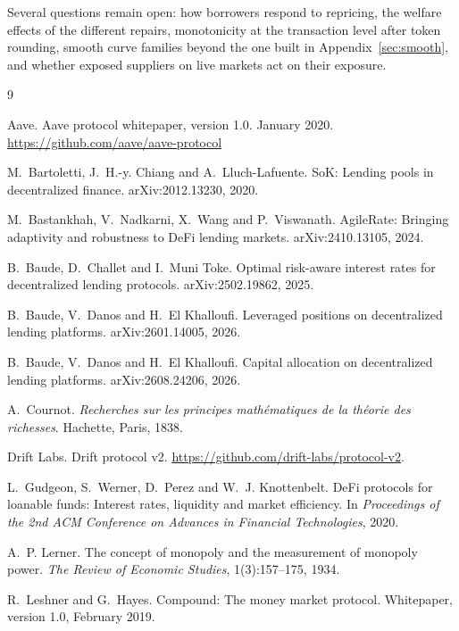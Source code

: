 \documentclass[11pt,a4paper]{article}
\begin{document}
Several questions remain open: how borrowers respond to repricing, the welfare effects of the different repairs, monotonicity at the transaction level after token rounding, smooth curve families beyond the one built in Appendix~\ref{sec:smooth}, and whether exposed suppliers on live markets act on their exposure.

\begin{thebibliography}{9}

Aave.
\newblock Aave protocol whitepaper, version 1.0.
\newblock January 2020.
\newblock \url{https://github.com/aave/aave-protocol}

M.~Bartoletti, J.~H.-y. Chiang and A.~Lluch-Lafuente.
\newblock SoK: Lending pools in decentralized finance.
\newblock arXiv:2012.13230, 2020.

M.~Bastankhah, V.~Nadkarni, X.~Wang and P.~Viswanath.
\newblock AgileRate: Bringing adaptivity and robustness to DeFi lending markets.
\newblock arXiv:2410.13105, 2024.

B.~Baude, D.~Challet and I.~Muni Toke.
\newblock Optimal risk-aware interest rates for decentralized lending protocols.
\newblock arXiv:2502.19862, 2025.

B.~Baude, V.~Danos and H.~El Khalloufi.
\newblock Leveraged positions on decentralized lending platforms.
\newblock arXiv:2601.14005, 2026.

B.~Baude, V.~Danos and H.~El Khalloufi.
\newblock Capital allocation on decentralized lending platforms.
\newblock arXiv:2608.24206, 2026.

A.~Cournot.
\newblock \emph{Recherches sur les principes math\'ematiques de la th\'eorie des richesses}.
\newblock Hachette, Paris, 1838.

Drift Labs.
\newblock Drift protocol v2.
\newblock \url{https://github.com/drift-labs/protocol-v2}.

L.~Gudgeon, S.~Werner, D.~Perez and W.~J. Knottenbelt.
\newblock DeFi protocols for loanable funds: Interest rates, liquidity and market efficiency.
\newblock In \emph{Proceedings of the 2nd ACM Conference on Advances in Financial Technologies}, 2020.

A.~P. Lerner.
\newblock The concept of monopoly and the measurement of monopoly power.
\newblock \emph{The Review of Economic Studies}, 1(3):157--175, 1934.

R.~Leshner and G.~Hayes.
\newblock Compound: The money market protocol.
\newblock Whitepaper, version 1.0, February 2019.

\end{thebibliography}
\end{document}

